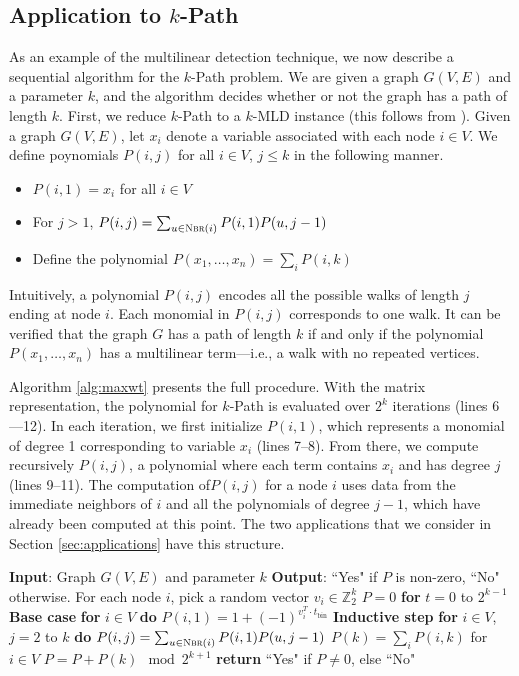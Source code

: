 \subsection{Application to $k$-Path}
As an example of the multilinear detection technique, we now describe a sequential algorithm for the $k$-Path problem. We are given a graph $G(V,E)$ and a parameter $k$, and the algorithm decides whether or not the graph has a path of length $k$. First, we reduce $k$-Path to a $k$-MLD instance (this follows from \cite{koutis:icalp08, williams2009finding}). Given a graph $G(V, E)$, let $x_i$ denote a variable associated with each node $i\in V$.
We define poynomials $P(i, j)$ for all $i\in V$, $j\leq k$ in the following manner.

\begin{itemize}
\item
$P(i, 1) = x_i$ for all $i\in V$
\item
For $j>1$,
$P(i, j) = \sum_{u\in\textsc{Nbr}(i)} P(i,1)P(u, j-1)$
\item
Define the polynomial $P(x_1,\ldots,x_n) = \sum_i P(i, k)$
\end{itemize}

Intuitively, a polynomial $P(i, j)$ encodes all the possible walks of length $j$ ending at node $i$. Each monomial in $P(i,j)$ corresponds to one walk. It can be verified that the graph $G$ has a path of length $k$ if and only if the polynomial $P(x_1,\ldots,x_n)$ has a multilinear term---i.e., a walk with no repeated vertices. 

Algorithm \ref{alg:maxwt} presents the full procedure. With the matrix representation, the polynomial for $k$-Path is evaluated over $2^k$ iterations (lines 6---12). In each iteration, we first initialize $P(i, 1)$, which represents a monomial of degree 1 corresponding to variable $x_i$
(lines 7--8). From there, we compute recursively $P(i,j)$, a polynomial where each term contains $x_i$ and has degree $j$ (lines 9--11). The computation of$P(i,j)$ for a node $i$ uses data from the immediate neighbors of $i$ and all the polynomials of degree $j-1$, which have already been computed at this point. The two applications that we consider in Section \ref{sec:applications} have this structure.

\begin{algorithm}{}
\small
\caption{\small \maxwt{}$(G(V, E), k)$.}
\label{alg:maxwt}
\begin{algorithmic}[1]
\STATE \textbf{Input}: Graph $G(V, E)$ and parameter $k$
\STATE\textbf{Output}: ``Yes" if $P$ is non-zero, ``No" otherwise.
\STATE
\STATE For each node $i$, pick a random vector $v_i \in \mathbb{Z}_{2}^k$
\STATE $P = 0$
\STATE \textbf{for} $t = 0$ to $2^{k-1}$
\STATE \quad \textbf{Base case}
\STATE \quad \textbf{for} $i \in V$ \textbf{do}
\STATE \quad \quad $P(i, 1) = 1 + (-1)^{v_i^T \cdot t_{\text{bin}}}$
\STATE \quad \textbf{Inductive step}
\STATE \quad \textbf{for} $i \in V$, $j = 2$ to $k$ \textbf{do}
\STATE \quad \quad
$P(i,j) = \sum_{u \in \textsc{Nbr}(i)} P(i, 1)P(u, j-1)$
\STATE \quad $P(k) = \sum_i P(i,k)$ for $i \in V$
\STATE \quad $P = P + P(k)  \mod 2^{k+1}$
\STATE \textbf{return} ``Yes" if $P \neq 0$, else ``No"
\end{algorithmic}
\end{algorithm}
